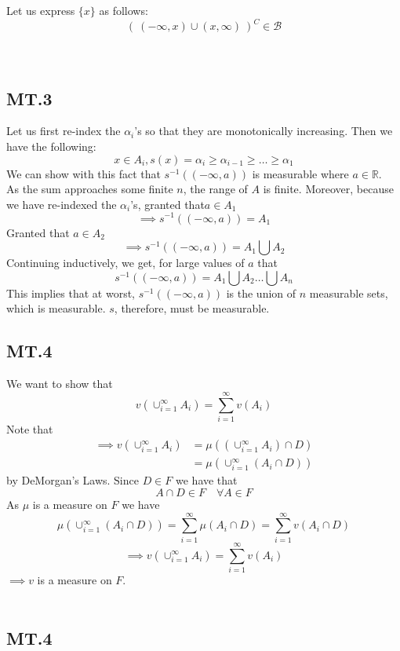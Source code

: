 \documentclass[letterpaper,12pt]{article}
\theoremstyle{definition}
\begin{document}
Let us express $\{x\}$  as follows: \[(\ (-\infty, x) \cup (x, \infty)\ )^C \in \mathscr{B}\]\\\\


\subsection*{MT.3}

Let us first re-index the $\alpha_i$'s so that they are monotonically increasing. Then we have the following: \[x \in A_i, s(x) = \alpha_i \geq \alpha_{i-1} \geq \hdots \geq \alpha_1\] We can show with this fact that $s^{-1}((-\infty,a))$ is measurable where $a \in \mathbb{R}$. \\
As the sum approaches some finite $n$, the range of $A$ is finite. Moreover, because we have re-indexed the $\alpha_i$'s, granted that$a \in A_1$ \[ \implies s^{-1}((-\infty,a)) = A_1\] Granted that $a \in A_2$ \[ \implies s^{-1}((-\infty,a))=A_1 \bigcup A_2 \] Continuing inductively, we get, for large values of $a$ that \[s^{-1}((-\infty,a))=A_1 \bigcup A_2 \hdots \bigcup A_n \] This implies that at worst, $s^{-1}((-\infty,a))$ is the union of $n$ measurable sets, which is measurable. $s$, therefore, must be measurable.

\subsection*{MT.4}

We want to show that
\[v(\cup_{i=1}^\infty A_i) = \sum_{i=1}^\infty v(A_i)\]
Note that
\begin{align*}
\implies v(\cup_{i=1}^\infty A_i)&=\mu((\cup_{i=1}^\infty A_i) \cap D)\\
&=\mu(\cup_{i=1}^\infty (A_i \cap D))
\end{align*}
by DeMorgan's Laws.
Since $D \in F$ we have that \[A \cap D \in F \quad  \forall A \in F\] As $\mu$ is a measure on $F$ we have
\[\mu(\cup_{i=1}^\infty (A_i \cap D))=\sum_{i=1}^\infty \mu(A_i \cap D)=\sum_{i=1}^\infty v(A_i \cap D)\]
\[ \implies v(\cup_{i=1}^\infty A_i) = \sum_{i=1}^\infty v(A_i) \]  $\implies v$ is a measure on $F$. \\\\

\subsection*{MT.4}
\end{document}
